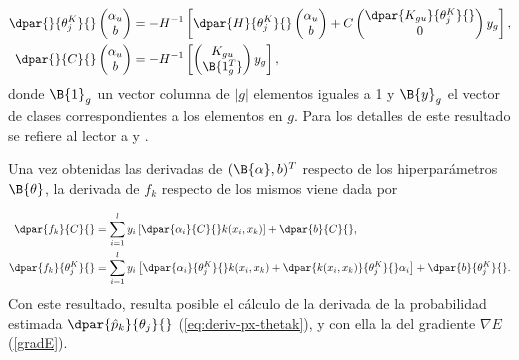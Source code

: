 \begin{align}
  \dpar{}{\theta^K_j}{} \begin{pmatrix}\alpha_{u}\\b\end{pmatrix} &=
    -H^{-1} \left[
      \dpar{H}{\theta^K_j}{}
      \begin{pmatrix}\alpha_{u}\\b\end{pmatrix}
        +C \begin{pmatrix}\dpar{K_{gu}}{\theta^K_j}{}\\0\end{pmatrix}
          y_g
          \right], \\
  \dpar{}{C}{} \begin{pmatrix}\alpha_{u}\\b\end{pmatrix} &=
    -H^{-1} \left[
      \begin{pmatrix}{K_{gu}}\\\B{1_g^T}\end{pmatrix} y_g
      \right],
\end{align}
donde $\B{1}_g$ un vector columna de $|g|$ elementos iguales a 1 y
$\B{y}_g$ el vector de clases correspondientes a los elementos en
$g$. Para los detalles de este resultado se refiere al lector a
\cite{glasmachers} y \cite{keerthi}.

Una vez obtenidas las derivadas de $({\B{\alpha},b})^T$ respecto de
los hiperparámetros $\B{\theta}$, la derivada de $f_k$  respecto
de los mismos viene dada por

\begin{align}
  \dpar{f_k}{C}{} &=  \sum_{i=1}^l y_i\left[
    \dpar{\alpha_i}{C}{} k(x_i,x_k) \right]
  + \dpar{b}{C}{} ,\\
  \dpar{f_k}{\theta^K_j}{} &=  \sum_{i=1}^l y_i \left[
    \dpar{\alpha_i}{\theta^K_j}{} k(x_i,x_k) +
    \dpar{k(x_i,x_k)}{\theta^K_j}{} \alpha_i \right]
  + \dpar{b}{\theta^K_j}{}.
\end{align}
Con este resultado, resulta posible el cálculo de la derivada de la
probabilidad estimada $\dpar{\hat{p}_k}{\theta_j}{}$
(\autoref{eq:deriv-px-thetak}), y con ella la del gradiente
$\nabla{}E$ (\autoref{gradE}).
